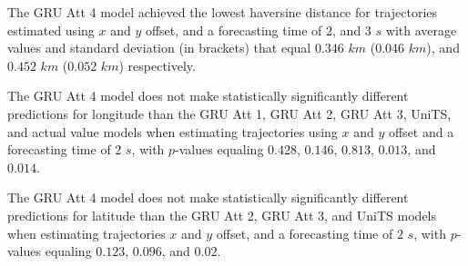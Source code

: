 \begin{table}[!ht]
	\centering
	\caption{The average haversine distance in $km$, with standard deviation in brackets, across k-fold validation datasets for the trajectories in the k-fold testing datasets estimated using $x$ and $y$ offset, different RNN models, and forecasting times.}
	\label{tab:best_no_abs_haversine}
\end{table}

The GRU Att 4 model achieved the lowest haversine distance for trajectories estimated using $x$ and $y$ offset, and a forecasting time of $2$, and $3$ $s$ with average values and standard deviation (in brackets) that equal $0.346$ $km$ ($0.046$ $km$), and $0.452$ $km$ ($0.052$ $km$) respectively.

The GRU Att 4 model does not make statistically significantly different predictions for longitude than the GRU Att 1, GRU Att 2, GRU Att 3, UniTS, and actual value models when estimating trajectories using $x$ and $y$ offset and a forecasting time of $2$ $s$, with $p$-values equaling $0.428$, $0.146$, $0.813$, $0.013$, and $0.014$.

The GRU Att 4 model does not make statistically significantly different predictions for latitude than the GRU Att 2, GRU Att 3, and UniTS models when estimating trajectories $x$ and $y$ offset, and a forecasting time of $2$ $s$, with $p$-values equaling $0.123$, $0.096$, and $0.02$.

